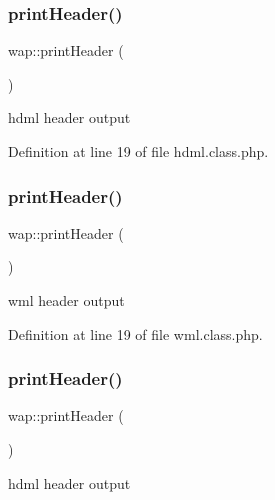 \subsubsection{\texorpdfstring{print\+Header()}{printHeader()}\hspace{0.1cm}{\footnotesize\ttfamily [1/3]}}
{\footnotesize\ttfamily wap\+::print\+Header (\begin{DoxyParamCaption}{ }\end{DoxyParamCaption})}



hdml header output 



Definition at line 19 of file hdml.\+class.\+php.

\mbox{\label{classwap_a402c6a180ae759c7a173a67441dfb716}} 
\subsubsection{\texorpdfstring{print\+Header()}{printHeader()}\hspace{0.1cm}{\footnotesize\ttfamily [2/3]}}
{\footnotesize\ttfamily wap\+::print\+Header (\begin{DoxyParamCaption}{ }\end{DoxyParamCaption})}



wml header output 



Definition at line 19 of file wml.\+class.\+php.

\mbox{\label{classwap_a402c6a180ae759c7a173a67441dfb716}} 
\subsubsection{\texorpdfstring{print\+Header()}{printHeader()}\hspace{0.1cm}{\footnotesize\ttfamily [3/3]}}
{\footnotesize\ttfamily wap\+::print\+Header (\begin{DoxyParamCaption}{ }\end{DoxyParamCaption})}



hdml header output 



